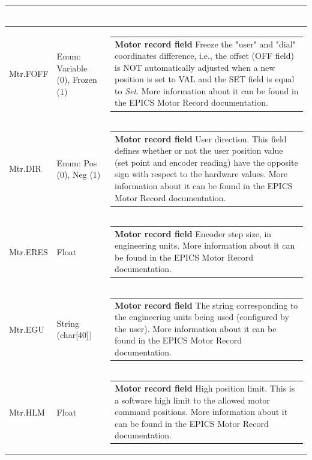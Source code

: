 \documentclass[openany]{article}
\begin{document}
\begin{longtable}{| m{4.5cm} m{2.5cm}  m{8.5cm} |}
\begin{tabular}{@{}m{6cm}@{}}
            \end{tabular} \hypertarget{pv:mtr-foff}{}\\ \hline
        Mtr.FOFF & Enum: Variable (0), Frozen (1) & \begin{tabular}{@{}m{6cm}@{}}
                \textbf{\color{ForestGreen} Motor record field} Freeze the "user" and "dial" coordinates difference, i.e., the offset (OFF field) is NOT automatically adjusted when a new position is set to VAL and the SET field is equal to \emph{Set}. More information about it can be found in the EPICS Motor Record documentation.
            \end{tabular} \hypertarget{pv:mtr-dir}{}\\ \hline
        Mtr.DIR & Enum: Pos (0), Neg (1) & \begin{tabular}{@{}m{6cm}@{}}
                \textbf{\color{ForestGreen} Motor record field} User direction. This field defines whether or not the user position value (set point and encoder reading) have the opposite sign with respect to the hardware values. More information about it can be found in the EPICS Motor Record documentation.
            \end{tabular} \hypertarget{pv:mtr-eres}{}\\ \hline
        Mtr.ERES & Float & \begin{tabular}{@{}m{6cm}@{}}
                \textbf{\color{ForestGreen} Motor record field} Encoder step size, in engineering units. More information about it can be found in the EPICS Motor Record documentation.
            \end{tabular} \hypertarget{pv:mtr-egu}{}\\ \hline
        Mtr.EGU & String (char[40]) & \begin{tabular}{@{}m{6cm}@{}}
                \textbf{\color{ForestGreen} Motor record field} The string corresponding to the engineering units being used (configured by the user). More information about it can be found in the EPICS Motor Record documentation.
            \end{tabular} \hypertarget{pv:mtr-hlm}{}\\ \hline
        Mtr.HLM & Float & \begin{tabular}{@{}m{6cm}@{}}
                \textbf{\color{ForestGreen} Motor record field} High position limit. This is a software high limit to the allowed motor command positions. More information about it can be found in the EPICS Motor Record documentation.

\end{tabular}
\end{longtable}
\end{document}
